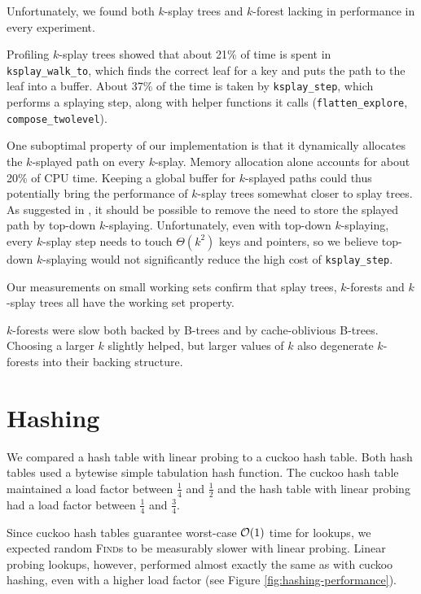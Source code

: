 Unfortunately, we found both $k$-splay trees and $k$-forest lacking in
performance in every experiment.

Profiling $k$-splay trees showed that about 21\% of time is spent in
\texttt{ksplay\_walk\_to}, which finds the correct leaf for a key and puts the
path to the leaf into a buffer. About 37\% of the time is taken by
\texttt{ksplay\_step}, which performs a splaying step, along with helper
functions it calls (\texttt{flatten\_explore}, \texttt{compose\_twolevel}).

One suboptimal property of our implementation is that it dynamically
allocates the $k$-splayed path on every $k$-splay. Memory allocation alone
accounts for about 20\% of CPU time.
Keeping a global buffer for $k$-splayed paths could thus potentially bring
the performance of $k$-splay trees somewhat closer to splay trees.
As suggested in \cite{ksplay-sherk}, it should be possible to remove the
need to store the splayed path by top-down $k$-splaying.
Unfortunately, even with top-down $k$-splaying, every $k$-splay step needs
to touch $\Theta(k^2)$ keys and pointers, so we believe top-down $k$-splaying
would not significantly reduce the high cost of \texttt{ksplay\_step}.

Our measurements on small working sets confirm that splay trees, $k$-forests
and $k$-splay trees all have the working set property.

$k$-forests were slow both backed by B-trees and by cache-oblivious B-trees.
Choosing a larger $k$ slightly helped, but larger values of $k$ also degenerate
\mbox{$k$-forests} into their backing structure.

\section{Hashing}
\label{sec:hashing-results}
We compared a hash table with linear probing to a cuckoo hash table.
Both hash tables used a bytewise simple tabulation hash function.
The cuckoo hash table maintained a load factor between $\frac{1}{4}$ and
$\frac{1}{2}$ and the hash table with linear probing had a load factor
between $\frac{1}{4}$ and $\frac{3}{4}$.

Since cuckoo hash tables guarantee worst-case $\mathcal{O}(1)$ time for lookups,
we expected random \textsc{Find}s to be measurably slower with linear probing.
Linear probing lookups, however, performed almost exactly the same as
with cuckoo hashing, even with a higher load factor (see Figure
\ref{fig:hashing-performance}).

